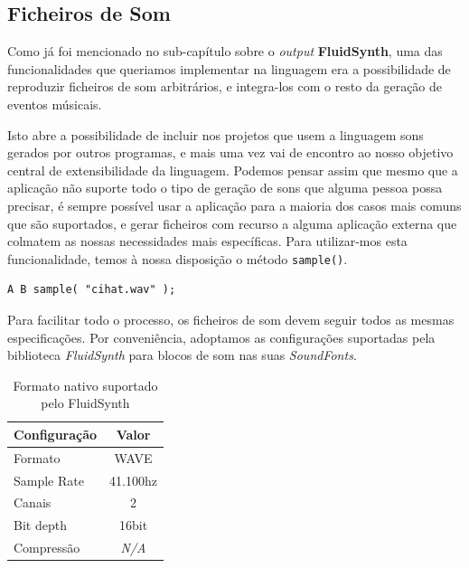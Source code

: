 \subsection{Ficheiros de Som}
Como já foi mencionado no sub-capítulo sobre o \textit{output} \textbf{FluidSynth}, uma das funcionalidades que queriamos implementar na linguagem era a possibilidade de reproduzir ficheiros de som arbitrários, e integra-los com o resto da geração de eventos músicais.

Isto abre a possibilidade de incluir nos projetos que usem a linguagem sons gerados por outros programas, e mais uma vez vai de encontro ao nosso objetivo central de extensibilidade da linguagem. Podemos pensar assim que mesmo que a aplicação não suporte todo o tipo de geração de sons que alguma pessoa possa precisar, é sempre possível usar a aplicação para a maioria dos casos mais comuns que são suportados, e gerar ficheiros com recurso a alguma aplicação externa que colmatem as nossas necessidades mais específicas. Para utilizar-mos esta funcionalidade, temos à nossa disposição o método \texttt{sample()}.

\begin{lstlisting}[caption=Exemplo de reproduzir um ficheiro a seguir a duas notas]
A B sample( "cihat.wav" );
\end{lstlisting}

Para facilitar todo o processo, os ficheiros de som devem seguir todos as mesmas especificações. Por conveniência, adoptamos as configurações suportadas pela biblioteca \textit{FluidSynth} para blocos de som nas suas \textit{SoundFonts}.

\begin{table}[h]
\centering
\def\arraystretch{1.3}
\begin{tabular}{|l|c|}
\hline
\textbf{Configuração} & \textbf{Valor} \\ \hline
Formato               & WAVE           \\ \hline
Sample Rate           & 41.100hz       \\ \hline
Canais                & 2              \\ \hline
Bit depth             & 16bit          \\ \hline
Compressão            & \textit{N/A}   \\ \hline
\end{tabular}
\caption{Formato nativo suportado pelo FluidSynth}
\label{tab:sounds-format}
\end{table}

